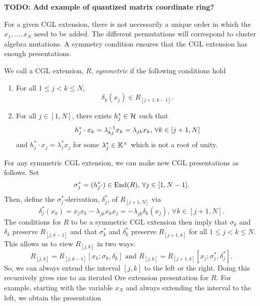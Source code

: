 \textbf{TODO: Add example of quantized matrix coordinate ring?}

For a given CGL extension, there is not necessarily a unique order in which the $x_1,
	\dots, x_N$ need to be added. The different permutations will correspond to cluster
algebra mutations. A symmetry condition ensures that the CGL extension has enough
presentations.

\begin{definition}
	We call a CGL extension, $R$, \emph{symmetric} if the following conditions hold
	\begin{enumerate}
		\item For all $1\leq j < k \leq N$,
		      \begin{equation*}
			      \delta_k (x_j) \in R_{[j+1, k-1]}.
		      \end{equation*}
		\item For all $j \in [1, N]$, there exists $h^*_j \in \mathcal{H}$ such that
		      \begin{equation*}
			      h^*_j \cdot x_k = \lambda_{kj}^{-1} x_k = \lambda_{jk}x_k, \, \forall k \in [j+1, N]
		      \end{equation*}
		      and $h^*_j \cdot x_j = \lambda^*_j x_j$ for some $\lambda_j^*\in \mathbb{K}^\times$ which is not a root of unity.
	\end{enumerate}
\end{definition}
For any symmetric CGL extension, we can make new CGL presentations as follows. Set
\begin{equation*}
	\sigma_j^* = (h_j^* \cdot) \in \operatorname{End}(R),\, \forall j \in [1, N-1].
\end{equation*}
Then, define the $\sigma_j^*$-derivation, $\delta_j^*$, of $R_[j+1, N]$ via
\begin{equation*}
	\delta_j^*(x_k) = x_j x_k - \lambda_{jk}x_kx_j = -\lambda_{jk} \delta_k (x_j), \, \forall k \in [j+1, N].
\end{equation*}
%
The conditions for $R$ to be a symmetric CGL extension then imply that $\sigma_k$ and
$\delta_k$ preserve $R_{[j, k-1]}$ and that $\sigma_k^*$ and $\delta_k^*$ preserve
$R_{[j+1, k]}$ for all $1 \leq j < k \leq N$. This allows us to view $R_{[j, k]}$ in
two ways:
\begin{equation*}
	R_{[j, k]} = R_{[j, k-1]}[x_k; \sigma_k, \delta_k] \text{ and } R_{[j,k]} = R_{[j+1, k]}[x_j; \sigma_j^*, \delta_j^*].
\end{equation*}
So, we can always extend the interval $[j, k]$ to the left or the right. Doing this recursively gives rise to an iterated Ore extension presentation for $R$. For example, starting with the variable $x_N$ and always extending the interval to the left, we obtain the presentation
